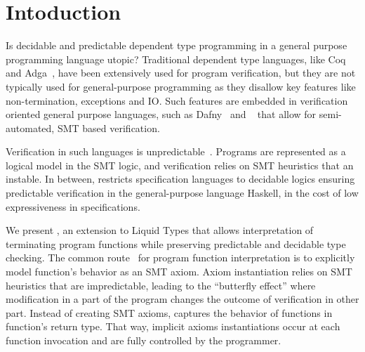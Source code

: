 
\section{Intoduction}\label{sec:intro}

Is decidable and predictable dependent
type programming in a general purpose
programming language utopic?
%
Traditional dependent type
languages, like Coq~\citep{coq-book}
and Adga~\citep{agda},
have been extensively used for
program verification, but they
are not typically used for
general-purpose programming
as they disallow key features
like non-termination, exceptions
and IO.
%
Such features are embedded in verification oriented
general purpose languages, such as
Dafny~\citep{dafny} and \fstar~\citep{fstar}
that allow for semi-automated, SMT based verification.
%

Verification in such languages is
unpredictable~\citep{Leino16}.
Programs are represented as a
logical model in the SMT logic,
and verification relies on SMT
heuristics that an instable.
%
In between, \liquidHaskell restricts
specification languages to
decidable logics ensuring
predictable verification in
the general-purpose language
Haskell, in the cost of low
expressiveness in specifications.

We present \libname,
an extension to Liquid Types that allows
interpretation of terminating program functions
while preserving predictable and decidable type checking.
%
The common route~\citep{dafny, fstar, HALO} for program function
interpretation is to explicitly model function's behavior as an SMT axiom.
Axiom instantiation relies on SMT heuristics that are impredictable,
leading to the ``butterfly effect'' where
modification in a part of the program changes the outcome of verification in other part.
%
Instead of creating SMT axioms, \libname captures the behavior of functions
in function's return type.
%
That way, implicit axioms instantiations occur at each function invocation
and are fully controlled by the programmer.

